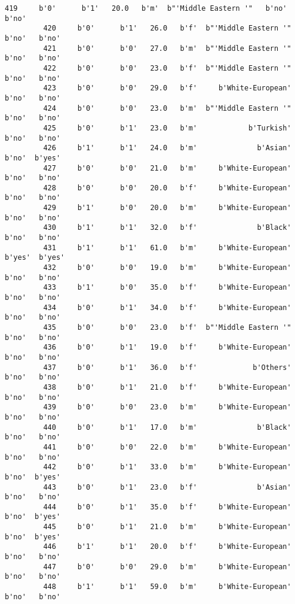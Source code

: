 \documentclass[11pt]{article}
\begin{document}
\begin{Verbatim}[commandchars=\\\{\}]
         419     b'0'      b'1'   20.0   b'm'  b"'Middle Eastern '"   b'no'   b'no'   
         420     b'0'      b'1'   26.0   b'f'  b"'Middle Eastern '"   b'no'   b'no'   
         421     b'0'      b'0'   27.0   b'm'  b"'Middle Eastern '"   b'no'   b'no'   
         422     b'0'      b'0'   23.0   b'f'  b"'Middle Eastern '"   b'no'   b'no'   
         423     b'0'      b'0'   29.0   b'f'     b'White-European'   b'no'   b'no'   
         424     b'0'      b'0'   23.0   b'm'  b"'Middle Eastern '"   b'no'   b'no'   
         425     b'0'      b'1'   23.0   b'm'            b'Turkish'   b'no'   b'no'   
         426     b'1'      b'1'   24.0   b'm'              b'Asian'   b'no'  b'yes'   
         427     b'0'      b'0'   21.0   b'm'     b'White-European'   b'no'   b'no'   
         428     b'0'      b'0'   20.0   b'f'     b'White-European'   b'no'   b'no'   
         429     b'1'      b'0'   20.0   b'm'     b'White-European'   b'no'   b'no'   
         430     b'1'      b'1'   32.0   b'f'              b'Black'   b'no'   b'no'   
         431     b'1'      b'1'   61.0   b'm'     b'White-European'  b'yes'  b'yes'   
         432     b'0'      b'0'   19.0   b'm'     b'White-European'   b'no'   b'no'   
         433     b'1'      b'0'   35.0   b'f'     b'White-European'   b'no'   b'no'   
         434     b'0'      b'1'   34.0   b'f'     b'White-European'   b'no'   b'no'   
         435     b'0'      b'0'   23.0   b'f'  b"'Middle Eastern '"   b'no'   b'no'   
         436     b'0'      b'1'   19.0   b'f'     b'White-European'   b'no'   b'no'   
         437     b'0'      b'1'   36.0   b'f'             b'Others'   b'no'   b'no'   
         438     b'0'      b'1'   21.0   b'f'     b'White-European'   b'no'   b'no'   
         439     b'0'      b'0'   23.0   b'm'     b'White-European'   b'no'   b'no'   
         440     b'0'      b'1'   17.0   b'm'              b'Black'   b'no'   b'no'   
         441     b'0'      b'0'   22.0   b'm'     b'White-European'   b'no'   b'no'   
         442     b'0'      b'1'   33.0   b'm'     b'White-European'   b'no'  b'yes'   
         443     b'0'      b'1'   23.0   b'f'              b'Asian'   b'no'   b'no'   
         444     b'0'      b'1'   35.0   b'f'     b'White-European'   b'no'  b'yes'   
         445     b'0'      b'1'   21.0   b'm'     b'White-European'   b'no'  b'yes'   
         446     b'1'      b'1'   20.0   b'f'     b'White-European'   b'no'   b'no'   
         447     b'0'      b'0'   29.0   b'm'     b'White-European'   b'no'   b'no'   
         448     b'1'      b'1'   59.0   b'm'     b'White-European'   b'no'   b'no'   

\end{Verbatim}
\end{document}
